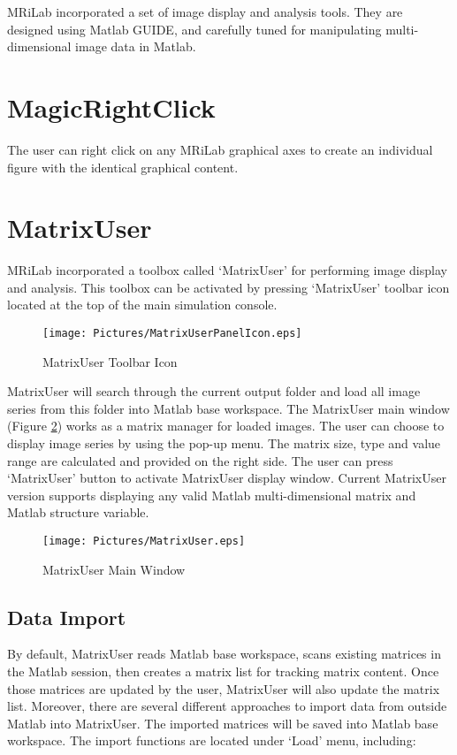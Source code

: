 \documentclass{book}%
\begin{document}
MRiLab incorporated a set of image display and analysis tools. They are designed using Matlab GUIDE, and carefully tuned for manipulating multi-dimensional image data in Matlab.

\section{MagicRightClick}
The user can right click on any MRiLab graphical axes to create an individual figure with the identical graphical content.

\section{MatrixUser}
MRiLab incorporated a toolbox called `MatrixUser' for performing image display and analysis. This toolbox can be activated by pressing `MatrixUser' toolbar icon located at the top of the main simulation console.

\begin{figure}[htbp]
	\centering
		\texttt{[image: Pictures/MatrixUserPanelIcon.eps]}
	\caption{MatrixUser Toolbar Icon}
	\label{fig:MatrixUserPanelIcon}
\end{figure}

MatrixUser will search through the current output folder and load all image series from this folder into Matlab base workspace. The MatrixUser main window (Figure \ref{fig:MatrixUser}) works as a matrix manager for loaded images. The user can choose to display image series by using the pop-up menu. The matrix size, type and value range are calculated and provided on the right side. The user can press `MatrixUser' button to activate MatrixUser display window. Current MatrixUser version supports displaying any valid Matlab multi-dimensional matrix and Matlab structure variable.

\begin{figure}[htbp]
	\centering
		\texttt{[image: Pictures/MatrixUser.eps]}
	\caption{MatrixUser Main Window}
	\label{fig:MatrixUser}
\end{figure}


\subsection{Data Import}

By default, MatrixUser reads Matlab base workspace, scans existing matrices in the Matlab session, then creates a matrix list for tracking matrix content. Once those matrices are updated by the user, MatrixUser will also update the matrix list. Moreover, there are several different approaches to import data from outside Matlab into MatrixUser. The imported matrices will be saved into Matlab base workspace. The import functions are located under `Load' menu, including:
\end{document}
